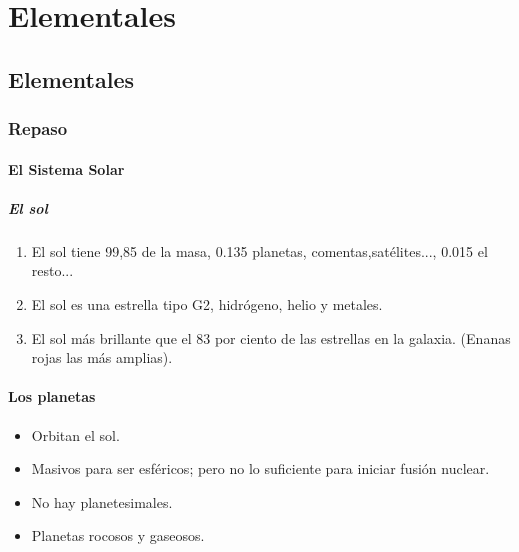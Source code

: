 \documentclass[11pt,fleqn]{book} %
\begin{document}
\part{Elementales}



\chapter{Elementales}

\section{Repaso}

\subsection{El Sistema Solar}

\subsubsection{El sol}
\begin{enumerate}
    \item El sol tiene 99,85 de la masa, 0.135 planetas, comentas,satélites..., 0.015 el resto...
    \item El sol es una estrella tipo G2, hidrógeno, helio y metales.
    \item El sol más brillante que el 83 por ciento de las estrellas en la galaxia. (Enanas rojas las más amplias). 
\end{enumerate}

\subsection{Los planetas}
    \begin{itemize}
        \item Orbitan el sol. 
        \item Masivos para ser esféricos; pero no lo suficiente para iniciar fusión nuclear. 
        \item No hay planetesimales.
        \item Planetas rocosos y gaseosos. 
        
    \end{itemize}
    
\end{document}
